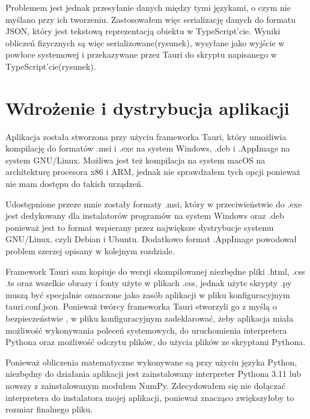 \documentclass{SGGW-thesis}
\begin{document}
		Problemem jest jednak przesyłanie danych między tymi językami, o czym nie myślano przy ich tworzeniu. Zastosowałem więc serializację danych do formatu JSON, który jest tekstową reprezentacją obiektu w TypeScript'cie. Wyniki obliczeń fizycznych są więc serializowane(rysunek), wysyłane jako wyjście w powłoce systemowej i przekazywane przez Tauri do skryptu napisanego w TypeScript'cie(rysunek).  
	\section{Wdrożenie i dystrybucja aplikacji}
	Aplikacja została stworzona przy użyciu frameworka Tauri, który umożliwia kompilację do formatów .msi i .exe na system Windows, .deb i .AppImage na system GNU/Linux. Możliwa jest też kompilacja na system macOS na architekturę procesora x86 i ARM, jednak nie sprawdzałem tych opcji ponieważ nie mam dostępu do takich urządzeń.
	
	Udostępnione przeze mnie zostały formaty .msi, który w przeciwieństwie do .exe jest dedykowany dla instalatorów programów na system Windows oraz .deb ponieważ jest to format wspierany przez największe dystrybucje systemu GNU/Linux, czyli Debian i Ubuntu. Dodatkowo format .AppImage powodował problem szerzej opisany w kolejnym rozdziale. 
	
	Framework Tauri sam kopiuje do wersji skompilowanej niezbędne pliki .html, .css .ts oraz wszelkie obrazy i fonty użyte w plikach .css, jednak użyte skrypty .py muszą być specjalnie oznaczone jako zasób aplikacji w pliku konfiguracyjnym tauri.conf.json. Ponieważ twórcy frameworka Tauri stworzyli go z myślą o bezpieczeństwie \cite{tauri-security}, w pliku konfiguracyjnym zadeklarować, żeby aplikacja miała możliwość wykonywania poleceń systemowych, do uruchomienia interpretera Pythona oraz możliwość odczytu plików, do użycia plików ze skryptami Pythona.
	
	Ponieważ obliczenia matematyczne wykonywane są przy użyciu języka Python, niezbędny do działania aplikacji jest zainstalowany interpreter Pythona 3.11 lub nowszy z zainstalowanym modułem NumPy. Zdecydowałem się nie dołączać interpretera do instalatora mojej aplikacji, ponieważ znacząco zwiększyłoby to rozmiar finalnego pliku. 
\end{document}
